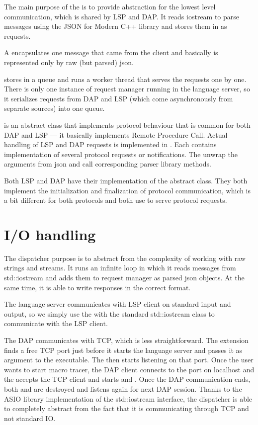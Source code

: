The main purpose of the  is to provide abstraction for the lowest level communication, which is shared by LSP and DAP. It reads iostream to parse messages using the JSON for Modern C++ library and stores them in  as requests.

A  encapsulates one message that came from the client and basically is represented only by raw (but parsed) json.

 stores  in a queue and runs a worker thread that serves the requests one by one. There is only one instance of request manager running in the language server, so it serializes requests from DAP and LSP (which come asynchronously from separate sources) into one queue.

 is an abstract class that implements protocol behaviour that is common for both DAP and LSP --- it basically implements Remote Procedure Call. Actual handling of LSP and DAP requests is implemented in . Each  contains implementation of several protocol requests or notifications. The  unwrap the arguments from json and call corresponding parser library methods.

Both LSP and DAP have their implementation of the abstract  class. They both implement the initialization and finalization of protocol communication, which is a bit different for both protocols and both use  to serve protocol requests.


\section{I/O handling}
The dispatcher purpose is to abstract from the complexity of working with raw strings and streams. It runs an infinite loop in which it reads messages from std::iostream and adds them to request manager as parsed json objects. At the same time, it is able to write responses in the correct format.

The language server communicates with LSP client on standard input and output, so we simply use the  with the standard std::iostream class to communicate with the LSP client.

The DAP communicates with TCP, which is less straightforward. The extension finds a free TCP port just before it starts the language server and passes it as argument to the executable. The  then starts listening on that port. Once the user wants to start macro tracer, the DAP client connects to the port on localhost and the  accepts the TCP client and starts  and . Once the DAP communication ends, both  and  are destroyed and  listens again for next DAP session. Thanks to the ASIO library implementation of the std::iostream interface, the dispatcher is able to completely abstract from the fact that it is communicating through TCP and not standard IO.

